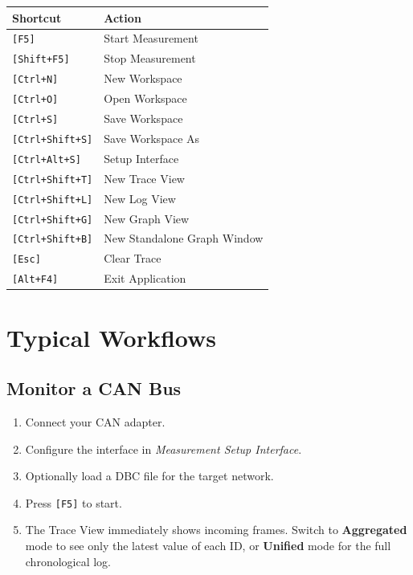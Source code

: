 \documentclass[a4paper,11pt]{article}
\newcommand{\key}[1]{\texttt{\small[#1]}}
\newcommand{\menu}[1]{\textit{#1}}
\newcommand{\ui}[1]{\textbf{#1}}
\begin{document}
\begin{longtable}{p{4.5cm} p{8.5cm}}
  \toprule
  \textbf{Shortcut} & \textbf{Action} \\
  \midrule
  \endhead
  \key{F5}               & Start Measurement \\
  \key{Shift+F5}         & Stop Measurement \\
  \key{Ctrl+N}           & New Workspace \\
  \key{Ctrl+O}           & Open Workspace \\
  \key{Ctrl+S}           & Save Workspace \\
  \key{Ctrl+Shift+S}     & Save Workspace As \\
  \key{Ctrl+Alt+S}       & Setup Interface \\
  \key{Ctrl+Shift+T}     & New Trace View \\
  \key{Ctrl+Shift+L}     & New Log View \\
  \key{Ctrl+Shift+G}     & New Graph View \\
  \key{Ctrl+Shift+B}     & New Standalone Graph Window \\
  \key{Esc}              & Clear Trace \\
  \key{Alt+F4}           & Exit Application \\
  \bottomrule
\end{longtable}

\section{Typical Workflows}

\subsection{Monitor a CAN Bus}

\begin{enumerate}
  \item Connect your CAN adapter.
  \item Configure the interface in \menu{Measurement \textrightarrow{} Setup Interface}.
  \item Optionally load a DBC file for the target network.
  \item Press \key{F5} to start.
  \item The Trace View immediately shows incoming frames. Switch to
        \ui{Aggregated} mode to see only the latest value of each ID,
        or \ui{Unified} mode for the full chronological log.
\end{enumerate}
\end{document}
